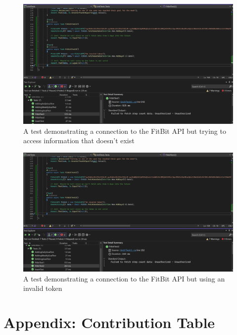 \documentclass[11pt]{article}
\begin{document}
\begin{figure}[!ht]
\centering
    \includegraphics[width=\linewidth]{fitbittest1.png}
\caption{A test demonstrating a connection to the FitBit API but trying to access information that doesn't exist}
\label{fig:API Test 1}
\end{figure}
\begin{figure}[!ht]
\centering
    \includegraphics[width=\linewidth]{fitbittest2.png}
\caption{A test demonstrating a connection to the FitBit API but using an invalid token }
\label{fig:API Test 2}
\end{figure}


\clearpage
\section{Appendix: Contribution Table}\label{app:ct}
\end{document}
